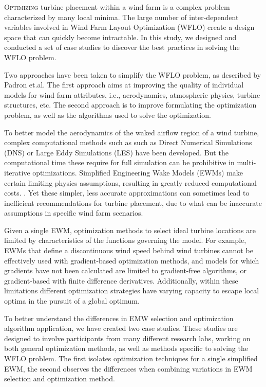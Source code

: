 \lettrine[nindent=0pt]{O}{ptimizing} turbine placement within a wind farm is a complex problem characterized by many local minima.
The large number of inter-dependent variables involved in Wind Farm Layout Optimization (WFLO) create a design space that can quickly become intractable.
In this study, we designed and conducted a set of case studies to discover the best practices in solving the WFLO problem.

Two approaches have been taken to simplify the WFLO problem, as described by Padron et.al.\cite{Padron2018}
The first approach aims at improving the quality of individual models for wind farm attributes, i.e., aerodynamics, atmospheric physics, turbine structures, etc.
The second approach is to improve formulating the optimization problem, as well as the algorithms used to solve the optimization. \cite{Padron2018}

To better model the aerodynamics of the waked airflow region of a wind turbine, complex computational methods such as such as Direct Numerical Simulations (DNS) or Large Eddy Simulations (LES) have been developed.
But the computational time these require for full simulation can be prohibitive in multi-iterative optimizations.
Simplified Engineering Wake Models (EWMs) make certain limiting physics assumptions, resulting in greatly reduced computational costs. \cite{HerbertAcero2014}.
Yet these simpler, less accurate approximations can sometimes lead to inefficient recommendations for turbine placement, due to what can be inaccurate assumptions in specific wind farm scenarios. %

Given a single EWM, optimization methods to select ideal turbine locations are limited by characteristics of the functions governing the model.
For example, EWMs that define a discontinuous wind speed behind wind turbines cannot be effectively used with gradient-based optimization methods, and models for which gradients have not been calculated are limited to gradient-free algorithms, or gradient-based with finite difference derivatives.
Additionally, within these limitations different optimization strategies have varying capacity to escape local optima in the pursuit of a global optimum. %

To better understand the differences in EMW selection and optimization algorithm application, we have created two case studies.
These studies are designed to involve participants from many different research labs, working on both general optimization methods, as well as methods specific to solving the WFLO problem.
The first isolates optimization techniques for a single simplified EWM, the second observes the differences when combining variations in EWM selection and optimization method.

